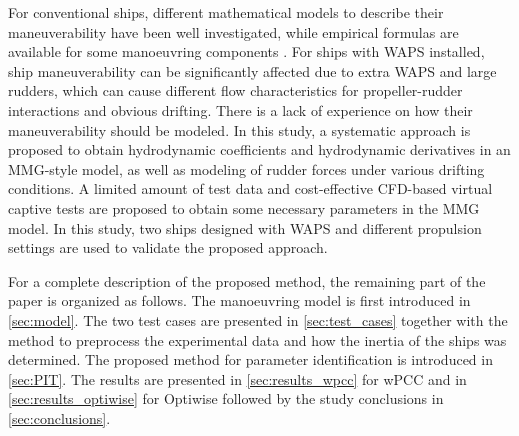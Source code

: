 For conventional ships, different mathematical models to describe their maneuverability have been well investigated, while empirical formulas are available for some manoeuvring components \citep{yasukawaIntroductionMMGStandard2015}. For ships with WAPS installed, ship maneuverability can be significantly affected due to extra WAPS and large rudders, which can cause different flow characteristics for propeller-rudder interactions and obvious drifting. There is a lack of experience on how their maneuverability should be modeled. In this study, a systematic approach is proposed to obtain hydrodynamic coefficients and hydrodynamic derivatives in an MMG-style model, as well as modeling of rudder forces under various drifting conditions. A limited amount of test data and cost-effective CFD-based virtual captive tests are proposed to obtain some necessary parameters in the MMG model. In this study, two ships designed with WAPS and different propulsion settings are used to validate the proposed approach.

For a complete description of the proposed method, the remaining part of the paper is organized as follows. The manoeuvring model is first introduced in \autoref{sec:model}. The two test cases are presented in \autoref{sec:test_cases} together with the method to preprocess the experimental data and how the inertia of the ships was determined. The proposed method for parameter identification is introduced in \autoref{sec:PIT}. The results are presented in \autoref{sec:results_wpcc} for wPCC and in \autoref{sec:results_optiwise} for Optiwise followed by the study conclusions in \autoref{sec:conclusions}.




